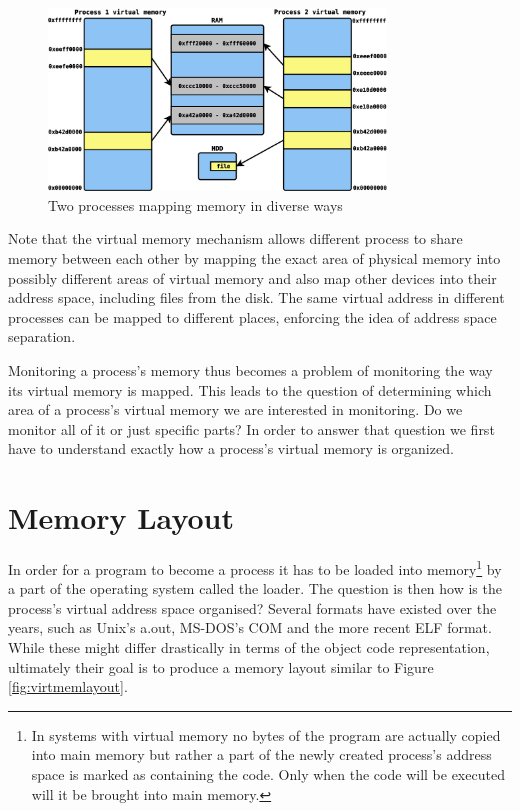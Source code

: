 \begin{figure}[htb]
\centering
\includegraphics[width=0.8\textwidth]{src/img/virtmem}
\caption{Two processes mapping memory in diverse ways}
\label{fig:virtmem}
\end{figure}

Note that the virtual memory mechanism allows different process to share memory between each other by mapping the exact area of physical memory into possibly different areas of virtual memory and also map other devices into their address space, including files from the disk. The same virtual address in different processes can be mapped to different places, enforcing the idea of address space separation.

Monitoring a process's memory thus becomes a problem of monitoring the way its virtual memory is mapped. This leads to the question of determining which area of a process's virtual memory we are interested in monitoring. Do we monitor all of it or just specific parts? In order to answer that question we first have to understand exactly how a process's virtual memory is organized.

\section{Memory Layout}
\label{section:memlayout}

In order for a program to become a process it has to be loaded into memory\footnote{In systems with virtual memory no bytes of the program are actually copied into main memory but rather a part of the newly created process's address space is marked as containing the code. Only when the code will be executed will it be brought into main memory.} by a part of the operating system called the loader. The question is then how is the process's virtual address space organised? Several formats have existed over the years, such as Unix's a.out, MS-DOS's COM and the more recent ELF format. While these might differ drastically in terms of the object code representation, ultimately their goal is to produce a memory layout similar to Figure \ref{fig:virtmemlayout}.

